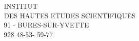 \begin{center}
INSTITUT\\
DES HAUTES ETUDES SCIENTIFIQUES\\
91 - BURES-SUR-YVETTE\\
928 48-53\quad - 59-77
\end{center}
